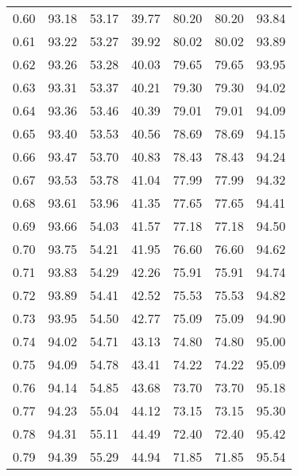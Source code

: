 \begin{tabular}{|c|c|c|c|c|c|c|}
      0.60 &     93.18 &     53.17 &      39.77 &   80.20 &      80.20 &         93.84 \\
      0.61 &     93.22 &     53.27 &      39.92 &   80.02 &      80.02 &         93.89 \\
      0.62 &     93.26 &     53.28 &      40.03 &   79.65 &      79.65 &         93.95 \\
      0.63 &     93.31 &     53.37 &      40.21 &   79.30 &      79.30 &         94.02 \\
      0.64 &     93.36 &     53.46 &      40.39 &   79.01 &      79.01 &         94.09 \\
      0.65 &     93.40 &     53.53 &      40.56 &   78.69 &      78.69 &         94.15 \\
      0.66 &     93.47 &     53.70 &      40.83 &   78.43 &      78.43 &         94.24 \\
      0.67 &     93.53 &     53.78 &      41.04 &   77.99 &      77.99 &         94.32 \\
      0.68 &     93.61 &     53.96 &      41.35 &   77.65 &      77.65 &         94.41 \\
      0.69 &     93.66 &     54.03 &      41.57 &   77.18 &      77.18 &         94.50 \\
      0.70 &     93.75 &     54.21 &      41.95 &   76.60 &      76.60 &         94.62 \\
      0.71 &     93.83 &     54.29 &      42.26 &   75.91 &      75.91 &         94.74 \\
      0.72 &     93.89 &     54.41 &      42.52 &   75.53 &      75.53 &         94.82 \\
      0.73 &     93.95 &     54.50 &      42.77 &   75.09 &      75.09 &         94.90 \\
      0.74 &     94.02 &     54.71 &      43.13 &   74.80 &      74.80 &         95.00 \\
      0.75 &     94.09 &     54.78 &      43.41 &   74.22 &      74.22 &         95.09 \\
      0.76 &     94.14 &     54.85 &      43.68 &   73.70 &      73.70 &         95.18 \\
      0.77 &     94.23 &     55.04 &      44.12 &   73.15 &      73.15 &         95.30 \\
      0.78 &     94.31 &     55.11 &      44.49 &   72.40 &      72.40 &         95.42 \\
      0.79 &     94.39 &     55.29 &      44.94 &   71.85 &      71.85 &         95.54 \\

\end{tabular}
